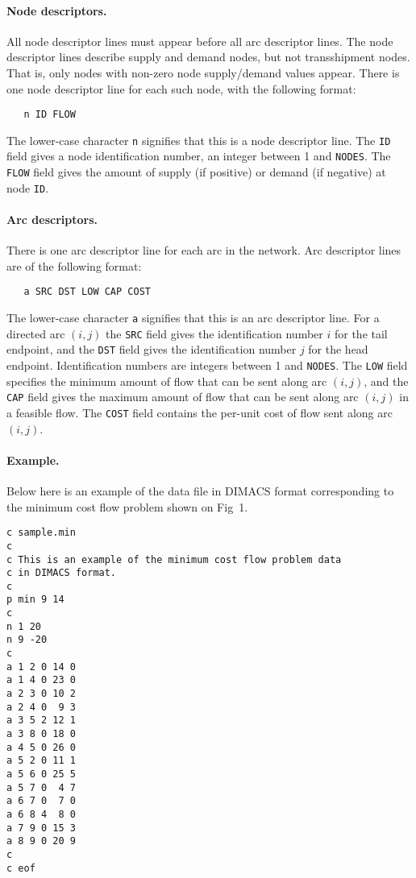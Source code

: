 \paragraph{Node descriptors.} All node descriptor lines must appear
before all arc descriptor lines. The node descriptor lines describe
supply and demand nodes, but not transshipment nodes. That is, only
nodes with non-zero node supply/demand values appear. There is one node
descriptor line for each such node, with the following format:

\begin{verbatim}
   n ID FLOW
\end{verbatim}

\noindent
The lower-case character \verb|n| signifies that this is a node
descriptor line. The \verb|ID| field gives a node identification number,
an integer between 1 and \verb|NODES|. The \verb|FLOW| field gives the
amount of supply (if positive) or demand (if negative) at node
\verb|ID|.

\paragraph{Arc descriptors.} There is one arc descriptor line for each
arc in the network. Arc descriptor lines are of the following format:

\begin{verbatim}
   a SRC DST LOW CAP COST
\end{verbatim}

\noindent
The lower-case character \verb|a| signifies that this is an arc
descriptor line. For a directed arc $(i,j)$ the \verb|SRC| field gives
the identification number $i$ for the tail endpoint, and the \verb|DST|
field gives the identification number $j$ for the head endpoint.
Identification numbers are integers between 1 and \verb|NODES|. The
\verb|LOW| field specifies the minimum amount of flow that can be sent
along arc $(i,j)$, and the \verb|CAP| field gives the maximum amount of
flow that can be sent along arc $(i,j)$ in a feasible flow. The
\verb|COST| field contains the per-unit cost of flow sent along arc
$(i,j)$.

\paragraph{Example.} Below here is an example of the data file in
DIMACS format corresponding to the minimum cost flow problem shown on
Fig~1.

\begin{footnotesize}
\begin{verbatim}
c sample.min
c
c This is an example of the minimum cost flow problem data
c in DIMACS format.
c
p min 9 14
c
n 1 20
n 9 -20
c
a 1 2 0 14 0
a 1 4 0 23 0
a 2 3 0 10 2
a 2 4 0  9 3
a 3 5 2 12 1
a 3 8 0 18 0
a 4 5 0 26 0
a 5 2 0 11 1
a 5 6 0 25 5
a 5 7 0  4 7
a 6 7 0  7 0
a 6 8 4  8 0
a 7 9 0 15 3
a 8 9 0 20 9
c
c eof
\end{verbatim}
\end{footnotesize}


